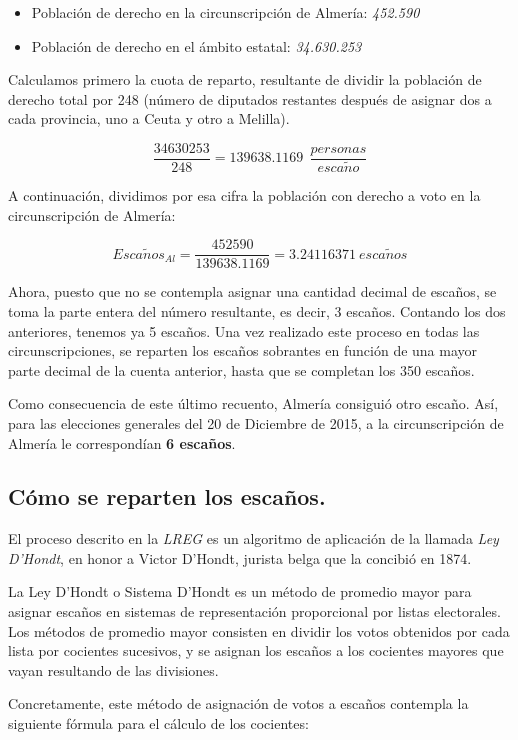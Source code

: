 \documentclass[11pt]{article}
\begin{document}
	\begin{itemize}
	\item Población de derecho en la circunscripción de Almería: \textit{452.590}
	\item Población de derecho en el ámbito estatal: \textit{34.630.253}
	\end{itemize}
	
	Calculamos primero la cuota de reparto, resultante de dividir la población de derecho total por 248 (número de diputados restantes después de asignar dos a cada provincia, uno a Ceuta y otro a Melilla).

	$$\dfrac{34630253}{248} = 139638.1169\ \ \frac{personas}{esca\tilde{n}o}$$
	
	A continuación, dividimos por esa cifra la población con derecho a voto en la circunscripción de Almería:
	
	$$Esca\tilde{n}os_{Al} = \dfrac{452590}{139638.1169} = 3.24116371\ esca\tilde{n}os$$

  Ahora, puesto que no se contempla asignar una cantidad decimal de escaños, se toma la parte entera del número resultante, es decir, 3 escaños. Contando los dos anteriores, tenemos ya 5 escaños. Una vez realizado este proceso en todas las circunscripciones, se reparten los escaños sobrantes en función de una mayor parte decimal de la cuenta anterior, hasta que se completan los 350 escaños.
  
  Como consecuencia de este último recuento, Almería consiguió otro escaño. Así, para las elecciones generales del 20 de Diciembre de 2015, a la circunscripción de Almería le correspondían \textbf{6 escaños}.
  
	\subsection{Cómo se reparten los escaños.}
	
	El proceso descrito en la \textit{LREG} es un algoritmo de aplicación de la llamada \textit{Ley D'Hondt}, en honor a Victor D'Hondt, jurista belga que la concibió en 1874.
	
	La Ley D'Hondt o Sistema D'Hondt es un método de promedio mayor para asignar escaños en sistemas de representación proporcional por listas electorales. Los métodos de promedio mayor consisten en dividir los votos obtenidos por cada lista por cocientes sucesivos, y se asignan los escaños a los cocientes mayores que vayan resultando de las divisiones.
	
	Concretamente, este método de asignación de votos a escaños contempla la siguiente fórmula para el cálculo de los cocientes:
	
\end{document}
